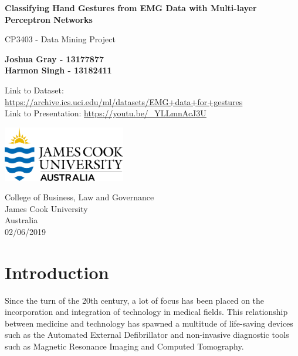 \documentclass[11pt]{article}
\begin{document}
	
	\begin{titlepage}
		\begin{center}
			\vspace*{1cm}
			
			\Huge
			\textbf{Classifying Hand Gestures from EMG Data with Multi-layer Perceptron Networks}
			
			\vspace{0.5cm}
			\LARGE
			CP3403 - Data Mining Project
			
			\vspace{1.5cm}
			
			\textbf{Joshua Gray - 13177877}\\	
			\textbf{Harmon Singh - 13182411}\\
			
			
			\vspace{0.8cm}
			
			Link to Dataset: \url{https://archive.ics.uci.edu/ml/datasets/EMG+data+for+gestures}\\
			Link to Presentation: \url{https://youtu.be/_YLLmnAcJ3U}
			
			\vfill			
					
			\vspace{0.8cm}
			
			\includegraphics[width=0.4\textwidth]{Figures/jculogo}
			
			\Large
			College of Business, Law and Governance\\
			James Cook University\\
			Australia\\
			02/06/2019
			
		\end{center}
	\end{titlepage}
	
	\tableofcontents
	\listoffigures
	\listoftables
	\newpage
		
	\section{Introduction}
	Since the turn of the 20th century, a lot of focus has been placed on the incorporation and integration of technology in medical fields. This relationship between medicine and technology has spawned a multitude of life-saving devices such as the Automated External Defibrillator and non-invasive diagnostic tools such as Magnetic Resonance Imaging and Computed Tomography.\\
	
\end{document}
